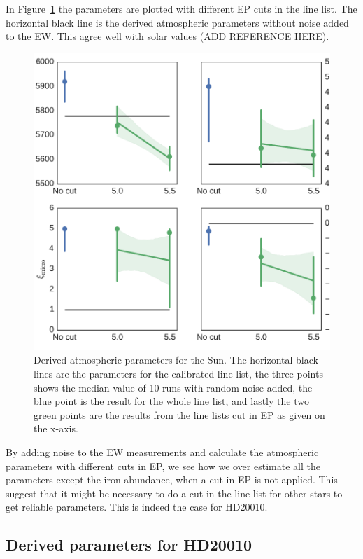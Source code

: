 \documentclass{aa}
\begin{document}
In Figure~\ref{fig:solar_parameters} the parameters are plotted with
different EP cuts in the line list. The horizontal black line is the
derived atmospheric parameters without noise added to the EW. This agree
well with solar values (ADD REFERENCE HERE).

\begin{figure}[htpb]
    \centering
    \includegraphics[width=0.9\linewidth]{figures/solar_parameters_10runs.pdf}
    \caption{Derived atmospheric parameters for the Sun. The horizontal black
    lines are the parameters for the calibrated line list, the three points
    shows the median value of 10 runs with random noise added, the blue point
    is the result for the whole line list, and lastly the two green points are the
    results from the line lists cut in EP as given on the x-axis.}
    \label{fig:solar_parameters}
\end{figure}

By adding noise to the EW measurements and calculate the atmospheric
parameters with different cuts in EP, we see how we over estimate all
the parameters except the iron abundance, when a cut in EP is not
applied. This suggest that it might be necessary to do a cut in the line
list for other stars to get reliable parameters. This is indeed the case
for HD20010.



\subsection{Derived parameters for HD20010}
\label{sec:derived_parameters_of_hd20010}
\end{document}
